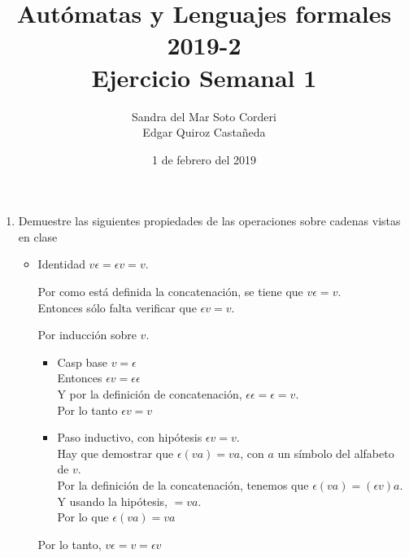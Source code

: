 \documentclass{article}
\begin{document}
\title{Autómatas y Lenguajes formales 2019-2\\
        \large Ejercicio Semanal 1}

\date{1 de febrero del 2019}

\author{Sandra del Mar Soto Corderi\\
        Edgar Quiroz Castañeda}

\maketitle


\begin{enumerate}
    \item {
        Demuestre las siguientes propiedades de las operaciones sobre cadenas 
        vistas en clase
        
        \begin{itemize}
            \item {
                Identidad $v\epsilon = \epsilon v = v$.

                Por como está definida la concatenación, se tiene que $v \epsilon = v$.\\
                Entonces sólo falta verificar que $\epsilon v = v$.

                Por inducción sobre $v$.
                \begin{itemize}
                    \item {
                        Casp base $v = \epsilon$\\
                        Entonces $\epsilon v = \epsilon\epsilon$\\
                        Y por la definición de concatenación, 
                        $\epsilon\epsilon = \epsilon = v$.\\
                        Por lo tanto $\epsilon v = v$
                    }

                    \item {
                        Paso inductivo, con hipótesis $\epsilon v = v$.\\ 
                        Hay que demostrar que $\epsilon (va) = va$, con $a$ un símbolo del alfabeto de $v$.\\
                        Por la definición de la concatenación, tenemos que $\epsilon (va) = (\epsilon v)a$.\\
                        Y usando la hipótesis, $ = va$.\\
                        Por lo que $\epsilon (va) = va$
                    }
                \end{itemize}
                Por lo tanto, $v \epsilon = v = \epsilon v$
            }


\end{itemize}}
\end{enumerate}
\end{document}
